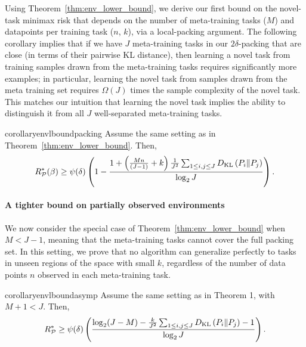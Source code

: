 % 

Using Theorem~\ref{thm:env_lower_bound}, we derive our first bound on the novel-task minimax risk that depends on the number of meta-training tasks ($M$) and datapoints per training task ($n$, $k$), via a local-packing argument. The following corollary implies that if we have $J$ meta-training tasks in our $2\delta$-packing that are close
(in terms of their pairwise KL distance), then learning a novel task from training samples drawn
from the meta-training tasks requires significantly more examples; in particular, learning the novel task from samples drawn from the
meta training set requires  $\Omega(J)$ times the sample complexity of the novel task. This matches our intuition that learning the novel task implies the ability to distinguish it from all $J$ well-separated meta-training tasks.
\begin{restatable}[]{corollary}{envlboundpacking}\label{corollary:env_lbound_packing}
Assume the same setting as in Theorem~\ref{thm:env_lower_bound}. Then,
\begin{align*}
R^*_{\mathcal{P}}(\beta) \geq \psi(\delta) \left(1 - \dfrac{1 + \left(\frac{Mn}{(J-1)} + k\right)\frac{1}{J^2}\sum_{1 \leq i,j \leq J}D_{\mathrm{KL}}\left(P_i\Vert P_j\right)}{\log_2 J}\right).
\end{align*}
\end{restatable}

\paragraph{A tighter bound on partially observed environments} We now consider the special case of Theorem~\ref{thm:env_lower_bound} when $M < J-1$, meaning that the meta-training tasks cannot cover the full packing set. In this setting, we prove that no algorithm can generalize perfectly to tasks in unseen regions of the space with small $k$, regardless of the number of data points $n$ observed in each meta-training task.

\begin{restatable}[]{corollary}{envlboundasymp}\label{thm:env_lower_bound_asymp}
Assume the same setting as in Theorem 1, with $M+1 < J$. Then,
\begin{align*}
R^*_{\mathcal{P}} \geq \psi(\delta)\left(\dfrac{\log_2 (J - M) - \frac{k}{J^2}\sum_{1 \leq i,j \leq J}D_{\mathrm{KL}}\left(P_i\Vert P_j\right) - 1}{\log_2 J}\right).
\end{align*}
\end{restatable}

